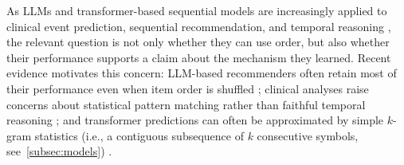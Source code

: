\documentclass{article}
\theoremstyle{plain}
\theoremstyle{definition}
\theoremstyle{remark}
\begin{document}
As LLMs and transformer-based sequential models are increasingly applied to clinical event prediction, sequential recommendation, and temporal reasoning \citep{savcisens2024using,delphi2025transformer,li2020behrt,rasmy2021medbert,fatemiTESTTIMEBENCHMARK2025}, the relevant question is not only whether they can use order, but also whether their performance supports a claim about the mechanism they learned. Recent evidence motivates this concern: LLM-based recommenders often retain most of their performance even when item order is shuffled \citep{kimLostSequenceLarge2025b}; clinical analyses raise concerns about statistical pattern matching rather than faithful temporal reasoning \citep{bediFidelityMedicalReasoning2025}; and transformer predictions can often be approximated by simple $k$-gram statistics (i.e., a contiguous subsequence of $k$ consecutive symbols, see~\ref{subsec:models}) \citep{nguyen2024understanding}.







\end{document}
